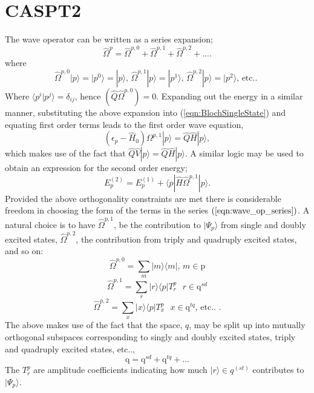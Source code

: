\section{CASPT2 }
\noindent The wave operator can be written as a series expansion;
\begin{equation}
\hat{\Omega}^{p} = \hat{\Omega}^{p,0}+\hat{\Omega}^{p,1}+\hat{\Omega}^{p,2}+....
\end{equation} 
where 
\begin{equation}
\hat{\Omega}^{p,0}|p\rangle = |p^{0}\rangle = |p\rangle \text{, \ \  }
\hat{\Omega}^{p,1}|p\rangle = |p^{1}\rangle \text{, \ \ }
\hat{\Omega}^{p,2}|p\rangle = |p^{2}\rangle \text{, \  etc.. }
\label{eqn:wave_op_series}
\end{equation} 
Where  $\langle p^{i} | p^{j} \rangle=  \delta_{ij}$,  hence $(\hat{Q}\hat{\Omega}^{p,0}) = 0$.
Expanding out the energy in a similar manner,
substituting the above expansion into (\ref{eqn:BlochSingleState}) and equating first order terms leads to the first order
wave equation,
\begin{equation}
(\epsilon_{p} - \hat{H}_{0} )\Omega^{p,1}|p\rangle = \hat{Q}\hat{H}|p\rangle ,
\label{eqn:Bloch_singlestate_firstorder}
\end{equation}
which makes use of the fact that $ \hat{Q}\hat{V}|p\rangle= \hat{Q}\hat{H}|p\rangle$. A similar logic may be
used to obtain an expression for the second order energy;
\begin{equation}
E_{p}^{(2)} = E_{p}^{(1)} + \langle p | \hat{H} \hat{\Omega}^{p,1}| p \rangle .
\label{eqn:single_state_ptE_second_order}
\end{equation}
Provided the above orthogonality constraints are met there is considerable freedom in choosing the form of the terms in the
series $(\ref{eqn:wave_op_series})$.  A natural choice is to have $\hat{\Omega}^{p,1}$, be the contribution
to $|\Psi_{p}\rangle$ from single and doubly excited states, $\hat{\Omega}^{p,2}$,  the contribution from triply
and quadruply excited states, and so on:
\begin{equation*}
\hat{\Omega}^{p,0} = \sum_{m} |m \rangle \langle m |   \text{, \ \ \  } m \in \mathrm{p}
\end{equation*}
\begin{equation*}
\hat{\Omega}^{p,1} = \sum_{r}| r \rangle \langle p | T^{p}_{r} \text{ \ \ \ } r \in \mathrm{q}^{sd} 
\end{equation*}
\begin{equation*}
\hat{\Omega}^{p,2} = \sum_{x}| x \rangle \langle p | T^{p}_{x} \text{ \ \ \ } x \in \mathrm{q}^{tq}  \text{, \  etc.. }.
\end{equation*}
The above makes use of the fact that the space, $q$, may be split up into mutually orthogonal 
subspaces corresponding to singly and doubly excited states, triply and quadruply excited states, etc..,
\begin{equation}
\mathrm{q} = \mathrm{q}^{sd} + \mathrm{q}^{tq} + ...
\end{equation}
The $T^{p}_{r}$ are amplitude coefficients indicating how much $|r\rangle \in q^{(st)}$
contributes to $|\Psi_{p}\rangle$.\\

